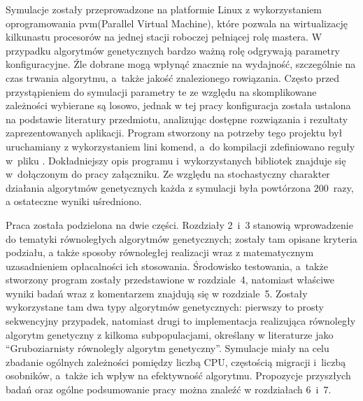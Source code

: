 Symulacje zostały przeprowadzone na platformie Linux z wykorzystaniem
oprogramowania pvm(Parallel Virtual Machine), które pozwala na wirtualizację
kilkunastu procesorów na jednej stacji roboczej pełniącej rolę mastera. W
przypadku algorytmów genetycznych bardzo ważną rolę odgrywają parametry
konfiguracyjne. Źle dobrane mogą wpłynąć znacznie na wydajność, szczególnie na
czas trwania algorytmu, a~także jakość znalezionego rowiązania. Często przed
przystąpieniem do symulacji parametry te ze względu na skomplikowane zależności
wybierane są losowo, jednak w tej pracy konfiguracja została ustalona na
podstawie literatury przedmiotu, analizując dostępne rozwiązania i rezultaty
zaprezentowanych aplikacji. Program stworzony na potrzeby tego projektu był
uruchamiany z wykorzystaniem lini komend, a~do kompilacji zdefiniowano reguły
w~pliku . Dokładniejszy opis programu i~wykorzystanych
bibliotek znajduje się w~dołączonym do pracy załączniku. 
Ze względu na stochastyczny charakter działania algorytmów genetycznych każda z
symulacji była powtórzona $200$~razy, a ostateczne wyniki uśredniono. 

Praca została podzielona na dwie części. Rozdziały 2~i~3 stanowią wprowadzenie
do tematyki równoległych algorytmów genetycznych; zostały tam opisane kryteria
podziału, a także sposoby równoległej realizacji wraz z matematycznym
uzasadnieniem opłacalności ich stosowania. Środowisko testowania, a~także
stworzony program zostały przedstawione w rozdziale~4, natomiast właściwe
wyniki badań wraz z komentarzem znajdują się w rozdziale~5. Zostały
wykorzystane tam dwa typy algorytmów genetycznych: pierwszy to prosty
sekwencyjny przypadek, natomiast drugi to implementacja realizująca równoległy
algorytm genetyczny z kilkoma subpopulacjami, określany w literaturze jako
``Gruboziarnisty równoległy algorytm genetyczny''. Symulacje miały na celu zbadanie
ogólnych zależności pomiędzy liczbą CPU, częstością migracji i~liczbą
osobników, a~także ich wpływ na efektywność algorytmu. Propozycje przyszłych
badań oraz ogólne podsumowanie pracy można znaleźć w rozdziałach 6~i~7.

